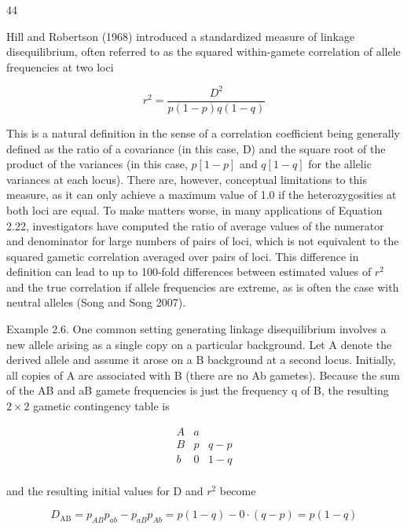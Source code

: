 \documentclass{article}
\begin{document}
44

Hill and Robertson (1968) introduced a standardized measure of linkage disequilibrium, often referred to as the squared within-gamete correlation of allele frequencies at two loci

\begin{equation}
r^{2}=\frac{D^{2}}{p(1-p)q(1-q)}
\tag{2.22}
\label{eq:2_22}
\end{equation}

This is a natural definition in the sense of a correlation coefficient being generally defined as the ratio of a covariance (in this case, D) and the square root of the product of the variances (in this case,  $ p[1 - p] $ and  $ q[1 - q] $ for the allelic variances at each locus). There are, however, conceptual limitations to this measure, as it can only achieve a maximum value of 1.0 if the heterozygosities at both loci are equal. To make matters worse, in many applications of Equation 2.22, investigators have computed the ratio of average values of the numerator and denominator for large numbers of pairs of loci, which is not equivalent to the squared gametic correlation averaged over pairs of loci. This difference in definition can lead to up to 100-fold differences between estimated values of  $ r^2 $ and the true correlation if allele frequencies are extreme, as is often the case with neutral alleles (Song and Song 2007).

Example 2.6. One common setting generating linkage disequilibrium involves a new allele arising as a single copy on a particular background. Let A denote the derived allele and assume it arose on a B background at a second locus. Initially, all copies of A are associated with B (there are no Ab gametes). Because the sum of the AB and aB gamete frequencies is just the frequency q of B, the resulting  $ 2 \times 2 $ gametic contingency table is

\begin{equation}
\begin{array}{ccc}{{{A}}}&{{{a}}} \\{{{B}}}&{{{p}}}&{{{q-p}}} \\{{{b}}}&{{{0}}}&{{{1-q}}} \\\end{array}
\end{equation}

and the resulting initial values for D and  $ r^{2} $ become

\begin{equation}
D_{\mathrm{AB}}=p_{AB}p_{ab}-p_{aB}p_{Ab}=p(1-q)-0\cdot(q-p)=p(1-q)
\end{equation}
\end{document}
